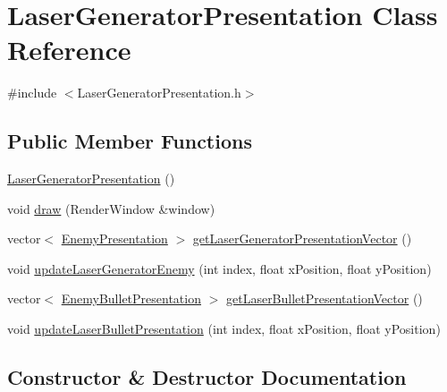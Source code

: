 \hypertarget{class_laser_generator_presentation}{}\section{Laser\+Generator\+Presentation Class Reference}
\label{class_laser_generator_presentation}


{\ttfamily \#include $<$Laser\+Generator\+Presentation.\+h$>$}

\subsection*{Public Member Functions}
\begin{DoxyCompactItemize}
\item 
\hyperlink{class_laser_generator_presentation_aa5c6c3b006f174ae8c61e16f0535925d}{Laser\+Generator\+Presentation} ()
\item 
void \hyperlink{class_laser_generator_presentation_a44a7cafde213e243cd0c6bf6f228d62c}{draw} (Render\+Window \&window)
\item 
vector$<$ \hyperlink{class_enemy_presentation}{Enemy\+Presentation} $>$ \hyperlink{class_laser_generator_presentation_abf5511b6140870dc912ebd78026b4b26}{get\+Laser\+Generator\+Presentation\+Vector} ()
\item 
void \hyperlink{class_laser_generator_presentation_a1f72a5e12d894fb4e2473bf3907359a2}{update\+Laser\+Generator\+Enemy} (int index, float x\+Position, float y\+Position)
\item 
vector$<$ \hyperlink{class_enemy_bullet_presentation}{Enemy\+Bullet\+Presentation} $>$ \hyperlink{class_laser_generator_presentation_a96fd1b356d6d9558f2bf78f5bbe9f9a5}{get\+Laser\+Bullet\+Presentation\+Vector} ()
\item 
void \hyperlink{class_laser_generator_presentation_a61063595265ba47e5db5061816cd0f08}{update\+Laser\+Bullet\+Presentation} (int index, float x\+Position, float y\+Position)
\end{DoxyCompactItemize}


\subsection{Constructor \& Destructor Documentation}
\mbox{\label{class_laser_generator_presentation_aa5c6c3b006f174ae8c61e16f0535925d}} 

